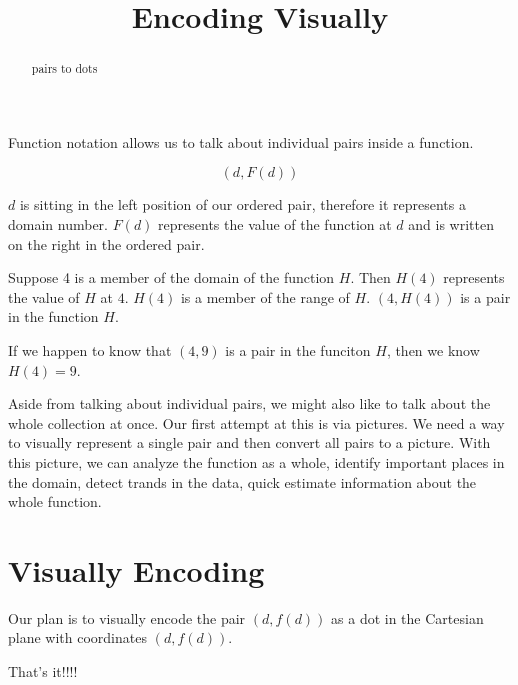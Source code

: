 \documentclass{ximera}
\title{Encoding Visually}
\begin{document}
\begin{abstract}
pairs to dots
\end{abstract}
\maketitle


Function notation allows us to talk about individual pairs inside a function.


\[
(d, F(d))
\]

$d$ is sitting in the left position of our ordered pair, therefore it represents a domain number. $F(d)$ represents the value of the function at $d$ and is written on the right in the ordered pair.


\begin{example}
Suppose 4 is a member of the domain of the function $H$. Then $H(4)$ represents the value of $H$ at $4$. $H(4)$ is a member of the range of $H$. $(4, H(4))$ is a pair in the function $H$.

If we happen to know that $(4, 9)$ is a pair in the funciton $H$, then we know $H(4) = 9$.

\end{example}


Aside from talking about individual pairs, we might also like to talk about the whole collection at once.  Our first attempt at this is via pictures. We need a way to visually represent a single pair and then convert all pairs to a picture.  With this picture, we can analyze the function as a whole, identify important places in the domain, detect trands in the data, quick estimate information about the whole function.


\section{Visually Encoding}

Our plan is to visually encode the pair $(d,f(d))$ as a dot in the Cartesian plane with coordinates $(d,f(d))$.

\begin{center}
That's it!!!!
\end{center}
\end{document}
